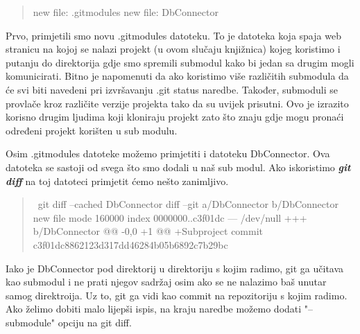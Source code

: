 \documentclass {article}
\begin{document}
\begin{enumerate}
\begin{enumerate}
\begin{quote}
	new file:   .gitmodules\newline
	new file:   DbConnector
\end{quote}

\newline

Prvo, primjetili smo novu .gitmodules datoteku.
\newline To je datoteka koja spaja web stranicu na kojoj se nalazi projekt (u ovom slučaju knjižnica) kojeg koristimo i putanju do direktorija gdje smo spremili submodul kako bi jedan sa drugim mogli komunicirati.
\newline
Bitno je napomenuti da ako koristimo više različitih submodula da će svi biti navedeni pri izvršavanju .git status naredbe.
\newline
Također, submoduli se provlače kroz različite verzije projekta tako da su uvijek prisutni. Ovo je izrazito korisno drugim ljudima koji kloniraju projekt zato što znaju gdje mogu pronaći određeni projekt korišten u sub modulu.

\newpage

Osim .gitmodules datoteke možemo primjetiti i datoteku DbConnector. Ova datoteka se sastoji od svega što smo dodali u naš sub modul. Ako iskoristimo \textbf{\emph{git diff}} na toj datoteci primjetit ćemo nešto zanimljivo.

\begin{quote}
    \ git diff --cached DbConnector
    \newline diff --git a/DbConnector b/DbConnector
    \newline new file mode 160000
   \newline index 0000000..c3f01dc
    \newline--- /dev/null
   \newline +++ b/DbConnector
   \newline @@ -0,0 +1 @@
   \newline +Subproject commit c3f01dc8862123d317dd46284b05b6892c7b29bc
\end{quote}

Iako je DbConnector pod direktorij u direktoriju s kojim radimo, git ga učitava kao submodul i ne prati njegov sadržaj osim ako se ne nalazimo baš unutar samog direktroija. Uz to, git ga vidi kao commit na repozitoriju s kojim radimo.
\newline Ako želimo dobiti malo lijepši ispis, na kraju naredbe možemo dodati "--submodule" opciju na git diff.


\end{enumerate}
\end{enumerate}
\end{document}
